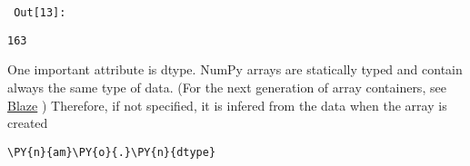         {\par%
        \vspace{-1\smallerfontscale}%
        \noindent%
        \begin{minipage}{\cellleftmargin}%
    \hfill%
    {\smaller%
    \tt%
    \color{nbframe-out-prompt}%
    Out[13]:}%
    \hspace{\inputpadding}%
    \hspace{0em}%
    \hspace{3pt}%
    \end{minipage}%
        }%
    \begin{addmargin}[\cellleftmargin]{0em}%
    {\smaller%
    \vspace{-1\smallerfontscale}%
    
    
    
    \begin{verbatim}
163
    \end{verbatim}

    
}%
    \end{addmargin}%
    One important attribute is dtype. NumPy arrays are statically typed and
contain always the same type of data. (For the next generation of array
containers, see
\href{http://blaze.pydata.org/docs/latest/index.html}{Blaze} )
Therefore, if not specified, it is infered from the data when the array
is created


{\par%
\vspace{-1\baselineskip}%
}%
\begin{notebookcell}[14]%
\begin{addmargin}[\cellleftmargin]{0em}%
{\smaller%
\par%
%
\vspace{-1\smallerfontscale}%
\begin{Verbatim}[commandchars=\\\{\}]
\PY{n}{am}\PY{o}{.}\PY{n}{dtype}
\end{Verbatim}
%
\par%
\vspace{-1\smallerfontscale}}%
\end{addmargin}
\end{notebookcell}

\par\vspace{1\smallerfontscale}%
    
